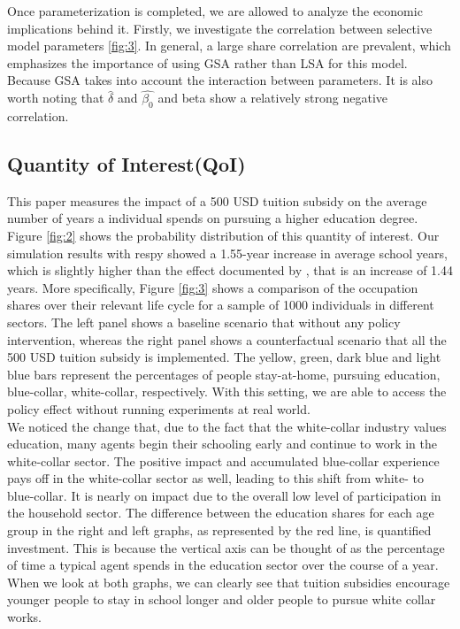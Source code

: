 \noindent
Once parameterization is completed, we are allowed to analyze the economic implications behind it. Firstly, we investigate the correlation between selective model parameters \ref{fig:3}. In general, a large share correlation are prevalent, which emphasizes the importance of using GSA rather than LSA for this model. Because GSA takes into account the interaction between parameters. It is also worth noting that $\hat{\delta}$ and $\hat{\beta_0}$ and beta show a relatively strong negative correlation. \\


\noindent
\subsection{Quantity of Interest(QoI)} \label{sec:2.3}


This paper measures the impact of a 500 USD tuition subsidy on the average number of years a individual spends on pursuing a higher education degree. Figure \ref{fig:2} shows the probability distribution of this quantity of interest. Our simulation results with respy\citep{janosgabler2020RespyFrameworkSimulation} showed a 1.55-year increase in average school years, which is slightly higher than the effect documented by \cite{keane1994SolutionEstimationDiscrete}, that is an increase of 1.44 years. More specifically, Figure \ref{fig:3} shows a comparison of the occupation shares over their relevant life cycle for a sample of 1000 individuals in different sectors. The left panel shows a baseline scenario that without any policy intervention, whereas the right panel shows a counterfactual scenario that all the 500 USD tuition subsidy is implemented. The yellow, green, dark blue and light blue bars represent the percentages of people stay-at-home, pursuing education, blue-collar, white-collar, respectively. With this setting, we are able to access the policy effect without running experiments at real world. \\

\noindent
We noticed the change that, due to the fact that the white-collar industry values education, many agents begin their schooling early and continue to work in the white-collar sector. The positive impact and accumulated blue-collar experience pays off in the white-collar sector as well, leading to this shift from white- to blue-collar. It is nearly on impact due to the overall low level of participation in the household sector. The difference between the education shares for each age group in the right and left graphs, as represented by the red line, is quantified investment. This is because the vertical axis can be thought of as the percentage of time a typical agent spends in the education sector over the course of a year. When we look at both graphs, we can clearly see that tuition subsidies encourage younger people to stay in school longer and older people to pursue white collar works.\\


